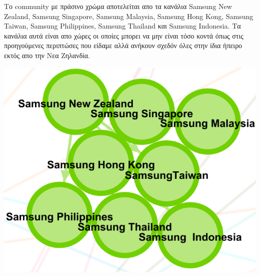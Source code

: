 \documentclass[12pt]{article}
\begin{document}
	\vspace{12pt}
	\vspace{12pt}
	\vspace{12pt}
	\begin{minipage}{0.6\textwidth}
		Το community με πράσινο χρώμα αποτελείται απο τα κανάλια Samsung New Zealand, Samsung Singapore, Samsung Malaysia, Samsung Hong Kong, Samsung Taiwan, Samsung Philippines, Samsung Thailand και Samsung Indonesia. Τα κανάλια αυτά είναι απο χώρες οι οποίες μπορει να μην είναι τόσο κοντά όπως στις προηγούμενες περιπτώσες που είδαμε αλλά ανήκουν σχεδόν όλες στην ίδια ήπειρο εκτός απο την Νεα Ζηλανδία.
	\end{minipage}
	\hspace{0.05\textwidth}
	\begin{minipage}{0.3\textwidth}
		\includegraphics[width=1.0\textwidth]{photos-files/section12/0.1/asia_community.png}
	\end{minipage}
\end{document}
